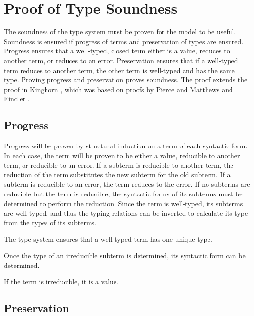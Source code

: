\chapter{Proof of Type Soundness}

The soundness of the type system must be proven for the model to be useful.  Soundness is ensured if progress of terms and preservation of types are ensured.  Progress ensures that a well-typed, closed term either is a value, reduces to another term, or reduces to an error.  Preservation ensures that if a well-typed term reduces to another term, the other term is well-typed and has the same type.  Proving progress and preservation proves soundness.  The proof extends the proof in Kinghorn \cite{kinghorn07}, which was based on proofs by Pierce \cite{pierce02} and Matthews and Findler \cite{matthews07}.

\section{Progress}

Progress will be proven by structural induction on a term of each syntactic form.  In each case, the term will be proven to be either a value, reducible to another term, or reducible to an error.  If a subterm is reducible to another term, the reduction of the term substitutes the new subterm for the old subterm.  If a subterm is reducible to an error, the term reduces to the error.  If no subterms are reducible but the term is reducible, the syntactic forms of its subterms must be determined to perform the reduction.  Since the term is well-typed, its subterms are well-typed, and thus the typing relations can be inverted to calculate its type from the types of its subterms.



The type system ensures that a well-typed term has one unique type.



Once the type of an irreducible subterm is determined, its syntactic form can be determined.



If the term is irreducible, it is a value.



\section{Preservation}

